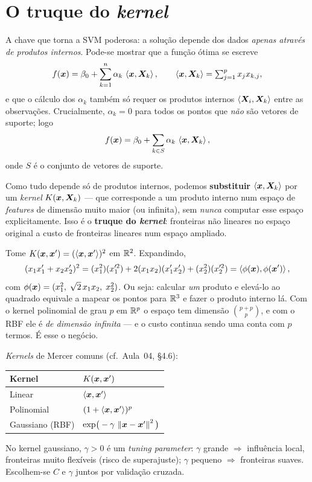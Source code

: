 \documentclass[11pt,a4paper]{article}
\begin{document}
\section{O truque do \emph{kernel}}
A chave que torna a SVM poderosa: a solução depende dos dados \emph{apenas através
de produtos internos}. Pode-se mostrar que a função ótima se escreve
\begin{equation}\label{eq:dual}
  f(\bm{x}) = \beta_0 + \sum_{k=1}^n \alpha_k\,\left\langle \bm{x}, \bm{X}_k \right\rangle,
  \qquad \left\langle \bm{x}, \bm{X}_k \right\rangle=\textstyle\sum_{j=1}^p x_j x_{k,j},
\end{equation}
e que o cálculo dos $\alpha_k$ também só requer os produtos internos
$\left\langle \bm{X}_i, \bm{X}_k \right\rangle$ entre as observações. Crucialmente, $\alpha_k=0$ para todos os
pontos que \emph{não} são vetores de suporte; logo
\[
  f(\bm{x}) = \beta_0 + \sum_{k\in S}\alpha_k\,\left\langle \bm{x}, \bm{X}_k \right\rangle,
\]
onde $S$ é o conjunto de vetores de suporte.

\begin{ideia}
Como tudo depende só de produtos internos, podemos \textbf{substituir}
$\left\langle \bm{x}, \bm{X}_k \right\rangle$ por um \emph{kernel} $K(\bm{x},\bm{X}_k)$ --- que corresponde a um produto
interno num espaço de \emph{features} de dimensão muito maior (ou infinita), sem
\emph{nunca} computar esse espaço explicitamente. Isso é o \textbf{truque do
\emph{kernel}}: fronteiras não lineares no espaço original a custo de fronteiras
lineares num espaço ampliado.
\end{ideia}

\begin{exemplo}
Tome $K(\bm{x},\bm{x}')=(\left\langle \bm{x}, \bm{x}' \right\rangle)^2$ em $\mathbb{R}^2$. Expandindo,
\[
  (x_1x_1'+x_2x_2')^2 = (x_1^2)(x_1'^2) + 2(x_1x_2)(x_1'x_2') + (x_2^2)(x_2'^2)
  = \left\langle \phi(\bm{x}), \phi(\bm{x}') \right\rangle,
\]
com $\phi(\bm{x})=(x_1^2,\;\sqrt2\,x_1x_2,\;x_2^2)$. Ou seja: calcular \emph{um} produto
e elevá-lo ao quadrado equivale a mapear os pontos para $\mathbb{R}^3$ e fazer o produto
interno lá. Com o kernel polinomial de grau $p$ em $\mathbb{R}^p$ o espaço tem dimensão
$\binom{p+p}{p}$, e com o RBF ele é \emph{de dimensão infinita} --- e o custo
continua sendo uma conta com $p$ termos. É esse o negócio.
\end{exemplo}

\noindent \emph{Kernels} de Mercer comuns (cf.\ Aula~04, §4.6):
\begin{center}\small
\renewcommand{\arraystretch}{1.4}
\begin{tabular}{@{}ll@{}}
\toprule
\textbf{Kernel} & \textbf{$K(\bm{x},\bm{x}')$} \\
\midrule
Linear      & $\left\langle \bm{x}, \bm{x}' \right\rangle$ \\
Polinomial  & $(1+\left\langle \bm{x}, \bm{x}' \right\rangle)^{p}$ \\
Gaussiano (RBF) & $\exp\!\big(-\gamma\,\left\lVert \bm{x}-\bm{x}' \right\rVert^2\big)$ \\
\bottomrule
\end{tabular}
\end{center}
No kernel gaussiano, $\gamma>0$ é um \emph{tuning parameter}: $\gamma$ grande
$\Rightarrow$ influência local, fronteiras muito flexíveis (risco de superajuste);
$\gamma$ pequeno $\Rightarrow$ fronteiras suaves. Escolhem-se $C$ e $\gamma$ juntos
por validação cruzada.
\end{document}
